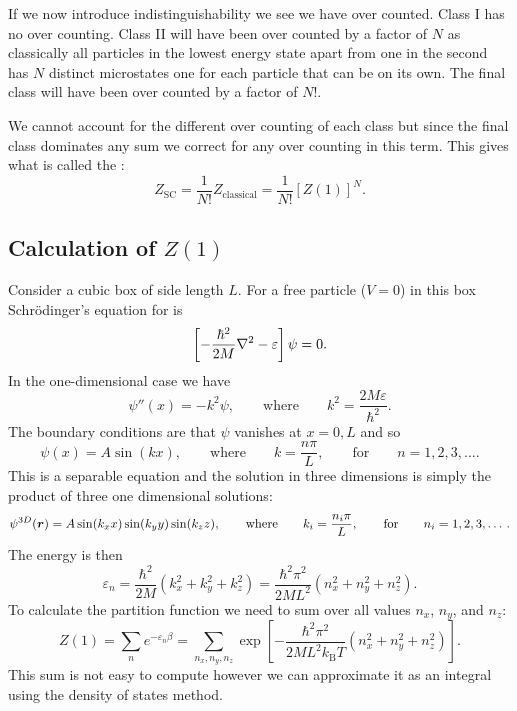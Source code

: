 \documentclass[a4paper]{article}
\newcommand{\boltzmann}{k_\mathrm{B}}
\begin{document}
    If we now introduce indistinguishability we see we have over counted.
    Class I has no over counting.
    Class II will have been over counted by a factor of \(N\) as classically all particles in the lowest energy state apart from one in the second has \(N\) distinct microstates one for each particle that can be on its own.
    The final class will have been over counted by a factor of \(N!\).
    
    We cannot account for the different over counting of each class but since the final class dominates any sum we correct for any over counting in this term.
    This gives what is called the :
    \[Z_{\mathrm{SC}} = \frac{1}{N!}Z_{\mathrm{classical}} = \frac{1}{N!}[Z(1)]^N.\]
    
    \subsection{Calculation of \texorpdfstring{\(Z(1)\)}{Z(1)}}
    Consider a cubic box of side length \(L\).
    For a free particle (\(V = 0\)) in this box Schr\"odinger's equation for is
    \[\left[-\frac{\hbar^2}{2M}\nabla^2 - \varepsilon\right]\psi = 0.\]
    In the one-dimensional case we have
    \[\psi''(x) = -k^2\psi, \qquad\text{where}\qquad k^2 = \frac{2M\varepsilon}{\hbar^2}.\]
    The boundary conditions are that \(\psi\) vanishes at \(x = 0, L\) and so
    \[\psi(x) = A\sin(kx), \qquad\text{where}\qquad k = \frac{n\pi}{L}, \qquad\text{for}\qquad n = 1, 2, 3, \dotsc.\]
    This is a separable equation and the solution in three dimensions is simply the product of three one dimensional solutions:
    \[\psi^{3D}(\bm{r}) = A\sin(k_x x)\sin(k_y y)\sin(k_z z), \qquad\text{where}\qquad k_i = \frac{n_i\pi}{L}, \qquad\text{for}\qquad n_i = 1, 2, 3, \dotsc.\]
    The energy is then
    \[\varepsilon_{n} = \frac{\hbar^2}{2M}(k_x^2 + k_y^2 + k_z^2) = \frac{\hbar^2\pi^2}{2ML^2}(n_x^2 + n_y^2 + n_z^2).\]
    To calculate the partition function we need to sum over all values \(n_x\), \(n_y\), and \(n_z\):
    \[Z(1) = \sum_{n}e^{-\varepsilon_n\beta} = \sum_{n_x, n_y, n_z} \exp\left[-\frac{\hbar^2\pi^2}{2ML^2\boltzmann T}(n_x^2 + n_y^2 + n_z^2)\right].\]
    This sum is not easy to compute however we can approximate it as an integral using the density of states method.
\end{document}

